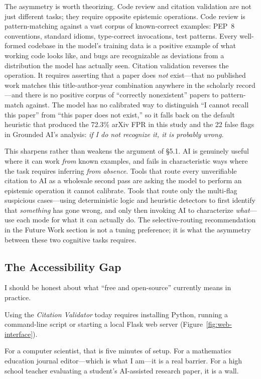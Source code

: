 The asymmetry is worth theorizing. Code review and citation validation are not just different tasks; they require opposite epistemic operations. Code review is pattern-matching against a vast corpus of known-correct examples: PEP~8 conventions, standard idioms, type-correct invocations, test patterns. Every well-formed codebase in the model's training data is a positive example of what working code looks like, and bugs are recognizable as deviations from a distribution the model has actually seen. Citation validation reverses the operation. It requires asserting that a paper does \emph{not} exist---that no published work matches this title-author-year combination anywhere in the scholarly record---and there is no positive corpus of ``correctly nonexistent'' papers to pattern-match against. The model has no calibrated way to distinguish ``I cannot recall this paper'' from ``this paper does not exist,'' so it falls back on the default heuristic that produced the 72.3\% arXiv FPR in this study and the 22 false flags in Grounded AI's analysis: \emph{if I do not recognize it, it is probably wrong.}

This sharpens rather than weakens the argument of \S5.1. AI is genuinely useful where it can work \emph{from} known examples, and fails in characteristic ways where the task requires inferring \emph{from absence}. Tools that route every unverifiable citation to AI as a wholesale second pass are asking the model to perform an epistemic operation it cannot calibrate. Tools that route only the multi-flag suspicious cases---using deterministic logic and heuristic detectors to first identify that \emph{something} has gone wrong, and only then invoking AI to characterize \emph{what}---use each mode for what it can actually do. The selective-routing recommendation in the Future Work section is not a tuning preference; it is what the asymmetry between these two cognitive tasks requires.

\subsection{The Accessibility Gap}

I should be honest about what ``free and open-source'' currently means in practice.

Using the \emph{Citation Validator} today requires installing Python, running a command-line script or starting a local Flask web server (Figure~\ref{fig:web-interface}).

For a computer scientist, that is five minutes of setup. For a mathematics education journal editor---which is what I am---it is a real barrier. For a high school teacher evaluating a student's AI-assisted research paper, it is a wall.

